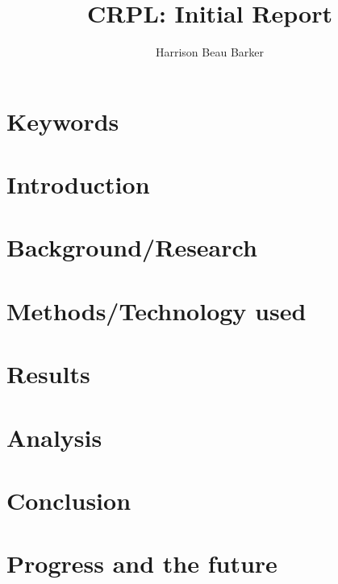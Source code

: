 \documentclass[11pt]{report}
\title{CRPL: Initial Report}
\author{Harrison Beau Barker}
\begin{document}
\maketitle
{}

\tableofcontents{}

\section{Keywords}

\section{Introduction}

\section{Background/Research}

\section{Methods/Technology used}

\section{Results}

\section{Analysis}

\section{Conclusion}

\section{Progress and the future}


\end{document}
